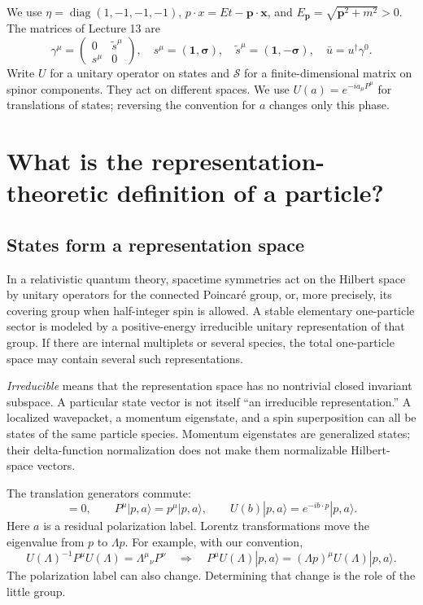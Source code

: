 \documentclass[11pt]{article}
\newcommand{\one}{\mathbf 1}
\newcommand{\diag}{\operatorname{diag}}
\begin{document}
\begin{keyidea}
We use \(\eta=\diag(1,-1,-1,-1)\),
\(p\cdot x=E t-\bm p\cdot\bm x\), and
\(E_{\bm p}=\sqrt{\bm p^2+m^2}>0\).
The matrices of Lecture 13 are
\[
 \gamma^\mu=\begin{pmatrix}0&\widetilde s^\mu\\s^\mu&0\end{pmatrix},
 \quad s^\mu=(\one,\bm\sigma),\quad
 \widetilde s^\mu=(\one,-\bm\sigma),\quad
 \bar u=u^\dagger\gamma^0.
\]
Write \(U\) for a unitary operator on states and \(\mathcal S\) for
a finite-dimensional matrix on spinor components. They act on
different spaces. We use \(U(a)=e^{-ia_\mu P^\mu}\) for translations
of states; reversing the convention for \(a\) changes only this phase.
\end{keyidea}

\section{What is the representation-theoretic definition of a particle?}
\subsection{States form a representation space}
In a relativistic quantum theory, spacetime symmetries act on the
Hilbert space by unitary operators for the connected Poincar\'e group,
or, more precisely, its covering group when half-integer spin is
allowed. A stable elementary one-particle sector is modeled by a
positive-energy irreducible unitary representation of that group.
If there are internal multiplets or several species, the total
one-particle space may contain several such representations.

\emph{Irreducible} means that the representation space has no nontrivial
closed invariant subspace. A particular state vector is not itself
``an irreducible representation.'' A localized wavepacket, a momentum
eigenstate, and a spin superposition can all be states of the same
particle species. Momentum eigenstates are generalized states; their
delta-function normalization does not make them normalizable
Hilbert-space vectors.

The translation generators commute:
\begin{equation}
 [P^\mu,P^\nu]=0,\qquad
 P^\mu|p,a\rangle=p^\mu|p,a\rangle,
 \qquad U(b)|p,a\rangle=e^{-ib\cdot p}|p,a\rangle.
 \label{eq:translation}
\end{equation}
Here \(a\) is a residual polarization label. Lorentz transformations
move the eigenvalue from \(p\) to \(\Lambda p\). For example, with
our convention,
\begin{equation}
 U(\Lambda)^{-1}P^\mu U(\Lambda)
    =\Lambda^\mu{}_{\nu}P^\nu
 \quad\Longrightarrow\quad
 P^\mu U(\Lambda)|p,a\rangle
    =(\Lambda p)^\mu U(\Lambda)|p,a\rangle.
 \label{eq:momentumcov}
\end{equation}
The polarization label can also change. Determining that change is
the role of the little group.
\end{document}
